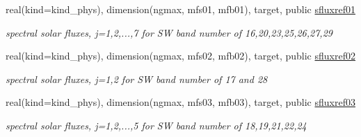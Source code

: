 \begin{Indent}
\begin{DoxyCompactItemize}
real(kind=kind\+\_\+phys), dimension(ngmax, mfs01, mfb01), target, public \hyperlink{namespacemodule__radsw__sflux_a84205f359fb3e1a0e1d03e755c52dc78}{sfluxref01}
\begin{DoxyCompactList}\small\item\em spectral solar fluxes, j=1,2,...,7 for SW band number of 16,20,23,25,26,27,29 \end{DoxyCompactList}\item 
\mbox{\label{namespacemodule__radsw__sflux_aa57fca862289bd57327b9c3ef27e3e2f}} 
real(kind=kind\+\_\+phys), dimension(ngmax, mfs02, mfb02), target, public \hyperlink{namespacemodule__radsw__sflux_aa57fca862289bd57327b9c3ef27e3e2f}{sfluxref02}
\begin{DoxyCompactList}\small\item\em spectral solar fluxes, j=1,2 for SW band number of 17 and 28 \end{DoxyCompactList}\item 
\mbox{\label{namespacemodule__radsw__sflux_a95d2640cf0e6cf0ba4a8ca1758806e48}} 
real(kind=kind\+\_\+phys), dimension(ngmax, mfs03, mfb03), target, public \hyperlink{namespacemodule__radsw__sflux_a95d2640cf0e6cf0ba4a8ca1758806e48}{sfluxref03}
\begin{DoxyCompactList}\small\item\em spectral solar fluxes, j=1,2,...,5 for SW band number of 18,19,21,22,24 \end{DoxyCompactList}\end{DoxyCompactItemize}
\end{Indent}

